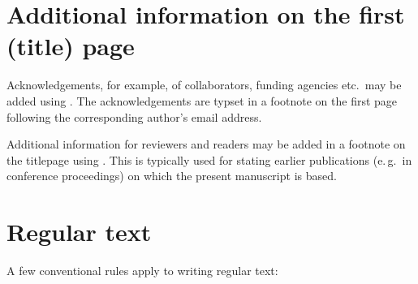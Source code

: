 \documentclass[a4paper]{ltxdoc}
\begin{document}
\section{Additional information on the first (title) page}
\DescribeMacro{\acknowledgments}%
Acknowledgements, for example, of collaborators, funding agencies etc.\ may be added using . The acknowledgements are typset in a footnote on the first page following the corresponding author’s email address.

\DescribeMacro{\authornote}%
Additional information for reviewers and readers may be added in a footnote on the titlepage using . This is typically used for stating earlier publications (e.\,g.\ in conference proceedings) on which the present manuscript is based. 



\section{Regular text}
A few conventional rules apply to writing regular text:
\end{document}
